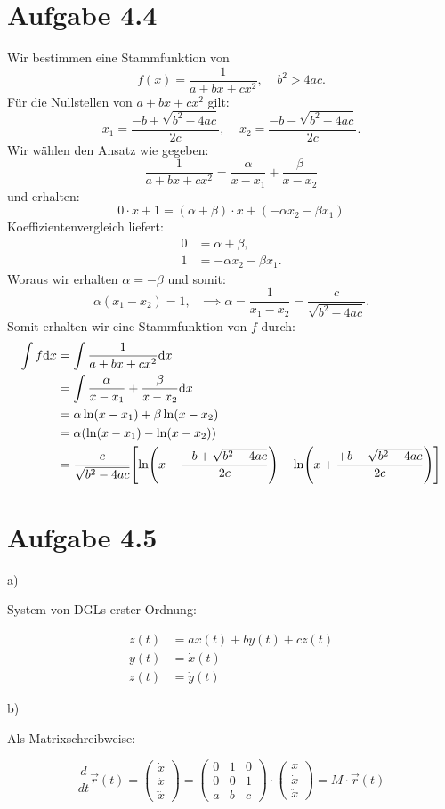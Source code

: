 \documentclass{theozettel}
\begin{document}
\section*{Aufgabe 4.4}
Wir bestimmen eine Stammfunktion von 
	\[
		f(x) = \frac{1}{a+bx+cx^2}, \ \ \ \ \ b^{2} > 4ac.
	\]
Für die Nullstellen von $a+bx+cx^{2}$ gilt:
	\[
		x_{1} = \frac{-b + \sqrt{b^{2}-4ac}}{2c}, \ \ \ \ \ x_{2} = \frac{-b - \sqrt{b^{2}-4ac}}{2c}.
	\]
Wir wählen den Ansatz wie gegeben:
	\[
		\frac{1}{a+bx+cx^2} = \frac{\alpha}{x-x_{1}} + \frac{\beta}{x-x_{2}}
	\]
und erhalten:
	\[
		0 \cdot x + 1 = (\alpha + \beta) \cdot x + (- \alpha x_{2} - \beta x_{1})
	\]
Koeffizientenvergleich liefert:
	\begin{align*}
		0 &= \alpha + \beta, \\
		1 &= -\alpha x_{2} - \beta x_{1}.
	\end{align*}
Woraus wir erhalten $\alpha = - \beta$ und somit:
	\[
		\alpha (x_{1} - x_{2}) = 1, \ \ \ \implies \alpha = \frac{1}{x_{1} - x_{2}} = \frac{c}{\sqrt{b^{2}-4ac}}.
	\]
Somit erhalten wir eine Stammfunktion von $f$ durch:
	\begin{align*}
		\int f \dd x &= \int \frac{1}{a+bx+cx^2} \dd x \\
		&= \int \frac{\alpha}{x-x_{1}} + \frac{\beta}{x-x_{2}} \dd x \\
		&= \alpha \ln(x-x_{1}) + \beta \ln(x-x_{2}) \\
		&= \alpha \qty(\ln(x-x_{1}) - \ln(x-x_{2})) \\
		&= \frac{c}{\sqrt{b^{2}-4ac}} \qty[ \ln(x - \frac{-b + \sqrt{b^{2}-4ac}}{2c}) - \ln(x + \frac{+b + \sqrt{b^{2}-4ac}}{2c}) ]
	\end{align*}


\newpage
\section*{Aufgabe 4.5}

a) 

System von DGLs erster Ordnung:

\begin{align}
\dot{z}(t) &= a x(t) + b y(t) + c z(t) \\
y(t) &= \dot{x}(t) \\
z(t) &= \dot{y}(t)
\end{align}

b)

Als Matrixschreibweise:

$$
\frac{d}{dt}\vec{r}(t) = \begin{pmatrix}
\dot{x} \\
\ddot{x} \\
\dddot{x}
\end{pmatrix} = \begin{pmatrix}
0 & 1 & 0 \\
0 & 0 & 1 \\
a & b & c
\end{pmatrix} \cdot \begin{pmatrix}
x \\
\dot{x} \\
\ddot{x}
\end{pmatrix} = M \cdot \vec{r}(t)
$$
\end{document}
